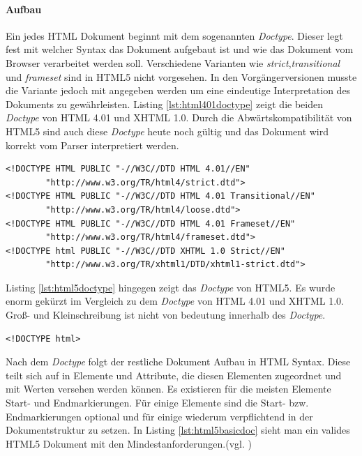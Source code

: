 \documentclass[12pt,a4paper,bibliography=totocnumbered,listof=totocnumbered]{scrartcl}
\begin{document}
\paragraph{Aufbau} Ein jedes HTML Dokument beginnt mit dem sogenannten \textit{Doctype}. Dieser legt fest mit welcher Syntax das Dokument aufgebaut ist und wie das Dokument vom Browser verarbeitet werden soll. Verschiedene Varianten wie \textit{strict},\textit{transitional} und \textit{frameset} sind in HTML5 nicht vorgesehen. In den Vorgängerversionen musste die Variante jedoch mit angegeben werden um eine eindeutige Interpretation des Dokuments zu gewährleisten. Listing \ref{lst:html401doctype} zeigt die beiden \textit{Doctype} von HTML 4.01 und XHTML 1.0. Durch die Abwärtskompatibilität von HTML5 sind auch diese \textit{Doctype} heute noch gültig und das Dokument wird korrekt vom Parser interpretiert werden.
    
    \vspace{1em}
	\begin{lstlisting}[caption=(X)HTML4.01 \textit{doctype}-Element, label=lst:html401doctype]
<!DOCTYPE HTML PUBLIC "-//W3C//DTD HTML 4.01//EN"
        "http://www.w3.org/TR/html4/strict.dtd">
<!DOCTYPE HTML PUBLIC "-//W3C//DTD HTML 4.01 Transitional//EN"
        "http://www.w3.org/TR/html4/loose.dtd">
<!DOCTYPE HTML PUBLIC "-//W3C//DTD HTML 4.01 Frameset//EN"
        "http://www.w3.org/TR/html4/frameset.dtd">        
<!DOCTYPE html PUBLIC "-//W3C//DTD XHTML 1.0 Strict//EN"
        "http://www.w3.org/TR/xhtml1/DTD/xhtml1-strict.dtd">    
	\end{lstlisting}
	
Listing \ref{lst:html5doctype}	hingegen zeigt das \textit{Doctype} von HTML5. Es wurde enorm gekürzt im Vergleich zu dem \textit{Doctype} von HTML 4.01 und XHTML 1.0. Groß- und Kleinschreibung ist nicht von bedeutung innerhalb des \textit{Doctype}. 

    \vspace{1em}
	\begin{lstlisting}[caption=HTML5 \textit{doctype}-Element, label=lst:html5doctype]
<!DOCTYPE html>
	\end{lstlisting}		
	
Nach dem \textit{Doctype} folgt der restliche Dokument Aufbau in HTML Syntax. Diese teilt sich auf in Elemente und Attribute, die diesen Elementen zugeordnet und mit Werten versehen werden können. Es existieren für die meisten Elemente Start- und Endmarkierungen. Für einige Elemente sind die Start- bzw. Endmarkierungen optional und für einige wiederum verpflichtend in der Dokumentstruktur zu setzen. In Listing \ref{lst:html5basicdoc} sieht man ein valides HTML5 Dokument mit den Mindestanforderungen.(vgl. \cite[S.58]{KronHTML2011})
\end{document}
